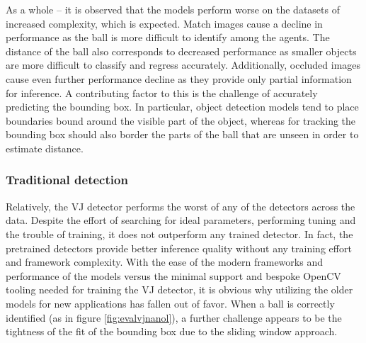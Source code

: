 \documentclass[a4paper,twoside,12pt]{report}
\begin{document}
As a whole -- it is observed that the models perform worse on the datasets of increased complexity, which is expected. Match images cause a decline in performance as the ball is more difficult to identify among the agents. The distance of the ball also corresponds to decreased performance as smaller objects are more difficult to classify and regress accurately. Additionally, occluded images cause even further performance decline as they provide only partial information for inference. A contributing factor to this is the challenge of accurately predicting the bounding box. In particular, object detection models tend to place boundaries bound around the visible part of the object, whereas for tracking the bounding box should also border the parts of the ball that are unseen in order to estimate distance. 

\subsubsection{Traditional detection}

Relatively, the VJ detector performs the worst of any of the detectors across the data. Despite the effort of searching for ideal parameters, performing tuning and the trouble of training, it does not outperform any trained detector. In fact, the pretrained detectors provide better inference quality without any training effort and framework complexity. With the ease of the modern frameworks and performance of the models versus the minimal support and bespoke OpenCV tooling needed for training the VJ detector, it is obvious why utilizing the older models for new applications has fallen out of favor. When a ball is correctly identified (as in figure \ref{fig:evalvjnanol}), a further challenge appears to be the tightness of the fit of the bounding box due to the sliding window approach.
\end{document}
